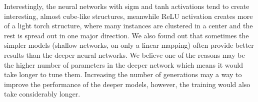 Interestingly, the neural networks with sigm and tanh activations tend to create interesting, almost cube-like structures, meanwhile ReLU activation creates more of a light torch structure, where many instances are clustered in a center and the rest is spread out in one major direction. We also found out that sometimes the simpler models (shallow networks, on only a linear mapping) often provide better results than the deeper neural networks. We believe one of the reasons may be the higher number of parameters in the deeper network which means it would take longer to tune them. Increasing the number of generations may a way to improve the performance of the deeper models, however, the training would also take considerably longer.

